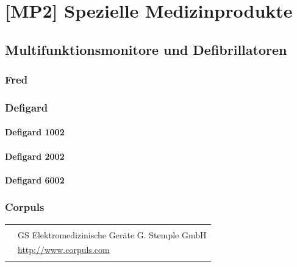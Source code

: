 \chapter{[MP2] Spezielle Medizinprodukte}
\label{chp:MPG}

\section{Multifunktionsmonitore und Defibrillatoren}

\subsection{Fred}

\subsection{Defigard\texttrademark}

\subsubsection{Defigard 1002}

\subsubsection{Defigard 2002}

\subsubsection{Defigard 6002}

\subsection{Corpuls\texttrademark}



\begin{table}[H]
\begin{tabulary}{\linewidth}{LL}
&
\\\addlinespace\midrule\addlinespace
{}
&
GS Elektromedizinische Geräte G. Stemple GmbH
\\\addlinespace
{}
&
\url{http://www.corpuls.com}
\\\addlinespace\bottomrule
\end{tabulary}
\end{table}

